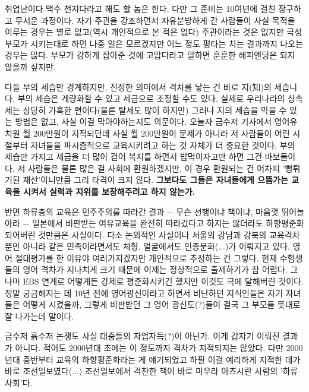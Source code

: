 취업난이다 백수 천지다라고 해도 할 놈은 한다. 다만 그 준비는 10여년에 걸친 장구하고 무서운 과정이다.
자기 주관을 강조하면서 자유분방하게 간 사람들이 사실 목적을 이루는 경우는 별로 없고(역시 개인적으로 본 적은 없다)
주관이라는 것은 없지만 극성 부모가 시키는대로 하면 나중 일은 모르겠지만 어느 정도 평타는 치는 결과까지 나오는 경우는 많다.
부모가 강하게 잡아준 것에 고맙다라고 말하면 훈훈한 해피엔딩은 되지 않을까 싶지만.
\vspace{5mm}

다들 부의 세습만 경계하지만, 진정한 의미에서 격차를 낳는 건 바로 지(知)의 세습니다.
부의 세습은 계량화할 수 있고 세금으로 조정할 수도 있다, 실제로 우리나라의 상속세는 상당히 가혹한 편이다(물론 탈세도 많이 하지만)
그러나 지의 세습을 막을 수 있는 방법은 없고, 사실 이걸 막아야하는지도 의문이다.
오늘자 금수저 기사에서 영어유치원 월 200만원이 지적되던데 사실 월 200만원이 문제가 아니라
저 사람들이 어린 시절부터 자녀들을 파시즘적으로 교육시키려고 하는 것 자체가 더 중요한 것이다.
부의 세습만 가지고 세금을 더 많이 걷어 복지를 하면서 밥먹이자고만 하면 그건 바보들이다.
저 사람들은 물론 많은 걸 사회에 환원하겠지만, 이 경우 환원되는 건 어차피 '뻥튀기된 재산'이니만큼 그리 타격이 크지 않다.
\textbf{그보다도 그들은 자녀들에게 으뜸가는 교육을 시켜서 실력과 지위를 보장해주려고 하지 않는가.}
\vspace{5mm}

반면 하류층의 교육은 민주주의를 따라간 결과 $-$ 무슨 선행이냐 책이냐, 마음껏 뛰어놀아라 $-$
일본에서 비판받는 여유교육을 완전히 따라갔다고 하지는 않더라도 하향평준화되어버린 것만큼은 사실이다.
다소 논외적인 사실이나 서울의 강남과 강북의 교육격차 뿐만 아니라 같은 민족이라면서도 체형, 얼굴에서도 인종분화(...)가 이뤄지고 있다.
영어 절대평가를 한 이유야 여러가지겠지만 개인적으로 추정하는 건 그렇다.
현재 수험생들의 영어 격차가 지나치게 크기 때문에 이제는 정상적으로 출제하기가 참 어렵다.
그나마 EBS 연계로 어떻게든 강제로 평준화시키긴 했지만 이것도 극에 달해버린 것이다.
정말 궁금해지는 데 10년 전에 영어광신이라고 하면서 비난하던 지식인들은 자기 자녀들은 어떻게 시켰을까,
그렇게 비판받던 그 영어 광신도(?)들이 결국 그 부모들 뜻대로 잘 나가는데 말이다.
\vspace{5mm}

금수저 흙수저 논쟁도 사실 대중들의 자업자득(?)이 아닌가.
이게 갑자기 이뤄진 결과가 아니다. 적어도 2000년대 초에는 이 정도까지 격차가 지적되지는 않았다.
다만 2000년대 중반부터 교육의 하향평준화라는 게 얘기되었고
하필 이걸 예리하게 지적한 데가 바로 조선일보였다(...)
조선일보에서 격찬한 책이 바로 미우라 아츠시란 사람의 '하류사회'다.
\vspace{5mm}

